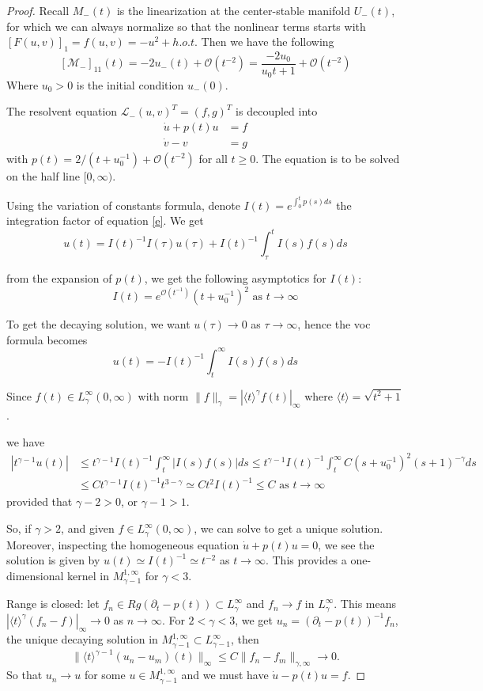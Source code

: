 \documentclass[letterpaper,11pt]{article}
\newcommand{\rmO}{\mathcal{O}}
\numberwithin{equation}{section}
\theoremstyle{plain}
\begin{document}
\begin{proof}
Recall $M_-(t)$ is the linearization at the center-stable manifold $U_-(t)$, for which we can always normalize so that the nonlinear terms starts with $[F(u,v)]_1 = f(u,v) = -u^2+h.o.t$. Then we have the following 
\[
[\mathcal{M}_-]_{11}(t) = -2u_-(t)+\rmO(t^{-2}) = \frac{-2u_0}{u_0 t +1} + \rmO(t^{-2})
\]
Where $u_0 > 0$ is the initial condition $u_-(0)$.

 The resolvent equation
$\mathcal{L}_- (u,v)^T = (f,g)^T$
is decoupled into
\begin{align}
\label{e}\dot{u}+p(t)u &= f\\
\label{ep}\dot{v}-v &=g
\end{align}
with $p(t) =  2/(t+u_0^{-1})+\rmO(t^{-2})$ for all $t \ge 0$. The equation is to be solved on the half line $[0,\infty)$.

Using the variation of constants formula, denote $I(t) = e^{\int_0^t p(s)ds}$ the integration factor of equation \eqref{e}. We get
\[
u(t) = I(t)^{-1}I(\tau)u(\tau)+I(t)^{-1}\int_{\tau}^t I(s)f(s)ds
\]

from the expansion of $p(t)$, we get the following asymptotics for $I(t)$:
\[
I(t) = e^{\rmO(t^{-1})}(t+u_0^{-1})^{2} \text{ as }t \to \infty
\]

To get the decaying solution, we want $u(\tau) \to 0$ as $\tau \to \infty$, hence the voc formula becomes
\[
u(t) = -I(t)^{-1}\int_t^\infty I(s)f(s)ds
\]


Since $f(t) \in L^{\infty}_{\gamma}(0,\infty)$ with norm $\|f\|_\gamma = |\langle t\rangle^{\gamma} f(t) |_{\infty}$ where $\langle t \rangle = \sqrt{t^2+1}$.

we have 
\begin{align*}
|t^{\gamma-1}u(t)| &\le t^{\gamma-1}I(t)^{-1}\int_t^{\infty} |I(s)f(s)|ds \le t^{\gamma-1}I(t)^{-1}\int_t^\infty C(s+u_0^{-1})^{2}(s+1)^{-\gamma}ds \\
&\le C t^{\gamma-1}I(t)^{-1} t^{3-\gamma} \simeq Ct^{2}I(t)^{-1} \le C \text{ as }t\to \infty
\end{align*}
provided that $\gamma-2>0$, or $\gamma-1>1$. 

So, if $\gamma>2$, and given $f \in L^{\infty}_{\gamma}(0,\infty)$, we can solve to get a unique solution. Moreover, inspecting the homogeneous equation $\dot{u} + p(t) u = 0$, we see the solution is given by $u(t) \simeq I(t)^{-1} \simeq t^{-2}$ as $t \to \infty$. This provides a one-dimensional kernel in $M^{1,\infty}_{\gamma-1}$ for $\gamma<3$.

Range is closed: let $f_n \in Rg( \partial_t - p(t)) \subset L_{\gamma}^\infty$ and $f_n \to f$ in $L_{\gamma}^{\infty}$. This means $|\langle t\rangle^{\gamma} (f_n-f)|_{\infty} \to 0$ as $n \to \infty$. For $2<\gamma<3$, we get $u_n = (\partial_t - p(t))^{-1}f_n$, the unique decaying solution in $M_{\gamma-1}^{1,\infty} \subset L_{\gamma-1}^{\infty}$, then
\[
\|\langle t\rangle^{\gamma-1} (u_n-u_m)(t)\|_{\infty} \le C\| f_n - f_m\|_{\gamma,\infty} \to 0.
\]
So that $u_n \to u$ for some $u \in M_{\gamma-1}^{1,\infty}$ and we must have $\dot{u} - p(t)u = f$.



\end{proof}
\end{document}
